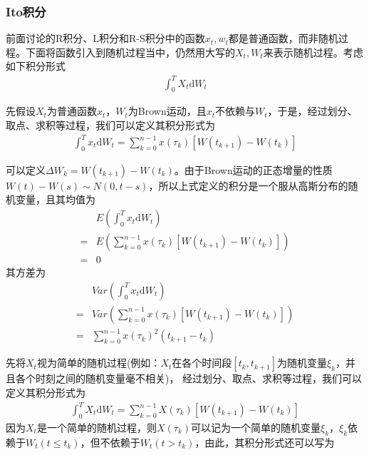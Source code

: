         \subsubsection{Ito积分}
            \label{subsubsec:Ito积分}
            前面讨论的R积分、L积分和R-S积分中的函数$x_t,w_t$都是普通函数，而非随机过程。下面将函数引入到随机过程当中，仍然用大写的$X_t,W_t$来表示随机过程。考虑如下积分形式
            \begin{align*}
                \int_0^T X_t \mathrm{d}W_t
            \end{align*}
            \par
            先假设$X_t$为普通函数$x_t$，$W_t$为Brown运动，且$x_t$不依赖与$W_t$，于是，经过划分、取点、求积等过程，我们可以定义其积分形式为
            \begin{align*}
                \int_0^T x_t \mathrm{d}W_t = \sum_{k = 0}^{n - 1} x(\tau_k)[W(t_{k+1}) - W(t_k)]
            \end{align*}
            \par
            可以定义$\Delta W_k = W(t_{k+1}) - W(t_k)$。由于Brown运动的正态增量的性质$W(t) - W(s) \sim N(0,t-s)$，所以上式定义的积分是一个服从高斯分布的随机变量，且其均值为
            \begin{align*}
                &E\left(\int_0^T x_t \mathrm{d}W_t\right) \\
                ={}& E\left( \sum_{k = 0}^{n - 1} x(\tau_k)[W(t_{k+1}) - W(t_k)] \right) \\
                ={}& 0
            \end{align*}
            其方差为
            \begin{align*}
                &Var\left(\int_0^T x_t \mathrm{d}W_t\right) \\
                ={}& Var\left( \sum_{k = 0}^{n - 1} x(\tau_k)[W(t_{k+1}) - W(t_k)] \right) \\
                ={}& \sum_{k = 0}^{n-1}x(\tau_k)^2 (t_{k+1} - t_k)
            \end{align*}
            \par
            先将$X_t$视为简单的随机过程(例如：$X_t$在各个时间段$[t_k,t_{k+1}]$为随机变量$\xi_k$，并且各个时刻之间的随机变量毫不相关)，
            经过划分、取点、求积等过程，我们可以定义其积分形式为
            \begin{align*}
                \int_0^T X_t \mathrm{d}W_t = \sum_{k = 0}^{n - 1} X(\tau_k)[W(t_{k+1}) - W(t_k)]
            \end{align*}
            因为$X_t$是一个简单的随机过程，则$X(\tau_k)$可以记为一个简单的随机变量$\xi_k$，$\xi_k$依赖于$W_t(t \leqslant t_k)$，但不依赖于$W_t(t>t_k)$，由此，其积分形式还可以写为
